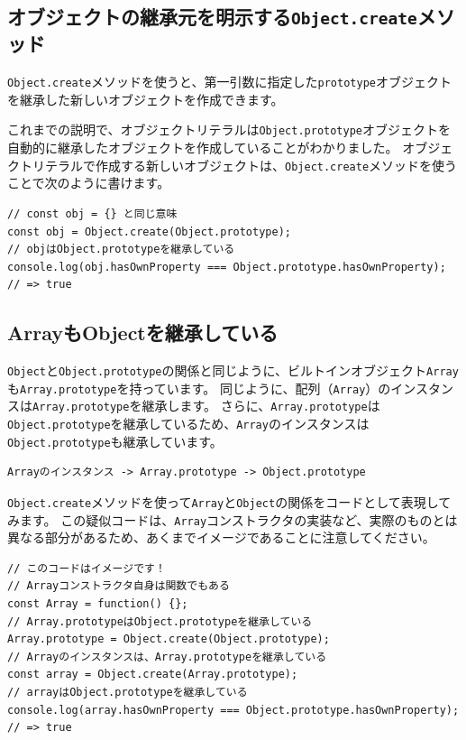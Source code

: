 \hypertarget{create-method}{%
\subsection{\texorpdfstring{オブジェクトの継承元を明示する\texttt{Object.create}メソッド}{オブジェクトの継承元を明示するObject.createメソッド}}\label{create-method}}

\texttt{Object.create}メソッドを使うと、第一引数に指定した\texttt{prototype}オブジェクトを継承した新しいオブジェクトを作成できます。

これまでの説明で、オブジェクトリテラルは\texttt{Object.prototype}オブジェクトを自動的に継承したオブジェクトを作成していることがわかりました。
オブジェクトリテラルで作成する新しいオブジェクトは、\texttt{Object.create}メソッドを使うことで次のように書けます。

\begin{lstlisting}
// const obj = {} と同じ意味
const obj = Object.create(Object.prototype);
// objはObject.prototypeを継承している
console.log(obj.hasOwnProperty === Object.prototype.hasOwnProperty); // => true
\end{lstlisting}

\hypertarget{inherit-object}{%
\subsection{ArrayもObjectを継承している}\label{inherit-object}}

\texttt{Object}と\texttt{Object.prototype}の関係と同じように、ビルトインオブジェクト\texttt{Array}も\texttt{Array.prototype}を持っています。
同じように、配列（\texttt{Array}）のインスタンスは\texttt{Array.prototype}を継承します。
さらに、\texttt{Array.prototype}は\texttt{Object.prototype}を継承しているため、\texttt{Array}のインスタンスは\texttt{Object.prototype}も継承しています。

\begin{lstlisting}
Arrayのインスタンス -> Array.prototype -> Object.prototype
\end{lstlisting}

\texttt{Object.create}メソッドを使って\texttt{Array}と\texttt{Object}の関係をコードとして表現してみます。
この疑似コードは、\texttt{Array}コンストラクタの実装など、実際のものとは異なる部分があるため、あくまでイメージであることに注意してください。

\begin{lstlisting}
// このコードはイメージです！
// Arrayコンストラクタ自身は関数でもある
const Array = function() {};
// Array.prototypeはObject.prototypeを継承している
Array.prototype = Object.create(Object.prototype);
// Arrayのインスタンスは、Array.prototypeを継承している
const array = Object.create(Array.prototype);
// arrayはObject.prototypeを継承している
console.log(array.hasOwnProperty === Object.prototype.hasOwnProperty); 
// => true
\end{lstlisting}

